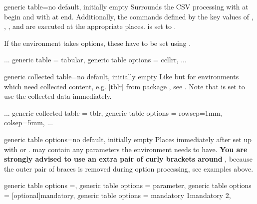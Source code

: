 \documentclass[a4paper,11pt]{ltxdoc}
\begin{document}
\begin{docCsvKey}[][doc new=2021-09-09]{generic table}{=}{no default, initially empty}
  Surrounds the CSV processing with 
  at begin and with  at end.
  Additionally, the commands defined by the key values of
  , , ,
  and  are executed at the appropriate places.
   is set to \cs{}\cs{}.\par
  If the environment  takes options, these have to be set using
  .

\begin{dispListing}
  ...
  generic table         = tabular,
  generic table options = {{ccllrr}},
  ...
\end{dispListing}
\end{docCsvKey}


\begin{docCsvKey}[][doc new=2021-09-09]{generic collected table}{=}{no default, initially empty}
  Like  but for environments which need
  collected content, e.g. |tblr| from package , see .
  Note that  is set to use the collected
  data immediately.

\begin{dispListing}
  ...
  generic collected table = tblr,
  generic table options   = {{rowsep=1mm, colsep=5mm}},
  ...
\end{dispListing}
\end{docCsvKey}


\begin{docCsvKey}[][doc new=2021-09-09]{generic table options}{=}{no default, initially empty}
  Places  immediately after  set up with
   or .
   may contain any parameters the environment  needs to have.
  \textbf{\color{red!50!black}You are strongly advised to use an extra pair of
  curly brackets  around }, because the outer pair of braces is
  removed during option processing, see examples above.
\begin{dispListing}
  generic table options =,
  generic table options = {{parameter}},
  generic table options = {[optional]{mandatory}},
  generic table options = {{mandatory 1}{mandatory 2}},
\end{dispListing}

\end{docCsvKey}
\end{document}
